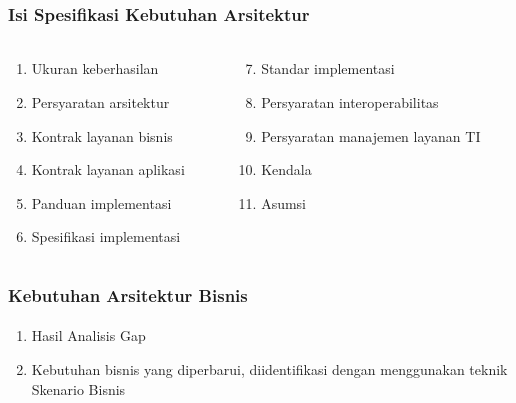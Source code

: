 \documentclass[aspectratio=169, table]{beamer}
\begin{document}
	
	
	\begin{frame}
		\frametitle{Isi Spesifikasi Kebutuhan Arsitektur}
		\framesubtitle{\hspace{1cm}}
		\begin{columns}
			\begin{column}{0.5\textwidth}
				\begin{center}
					\begin{enumerate}
						\item Ukuran keberhasilan
						\item Persyaratan arsitektur
						\item Kontrak layanan bisnis
						\item Kontrak layanan aplikasi
						\item Panduan implementasi
						\item Spesifikasi implementasi
						
					\end{enumerate}
				\end{center}
			\end{column}
			\begin{column}{0.5\textwidth}
				\begin{center}
					\begin{enumerate}
						\setcounter{enumi}{6}
						\item Standar implementasi
						\item Persyaratan interoperabilitas
						\item Persyaratan manajemen layanan TI
						\item Kendala
						\item Asumsi
					\end{enumerate}
				\end{center}
			\end{column}
		\end{columns}
	\end{frame}
	
	\begin{frame}
		\frametitle{Kebutuhan Arsitektur Bisnis}
		\framesubtitle{\hspace{1cm}}
		\begin{enumerate}
			\item Hasil Analisis Gap
			\item Kebutuhan bisnis yang diperbarui, diidentifikasi dengan menggunakan teknik Skenario Bisnis
		\end{enumerate}
	\end{frame}	
	
\end{document}
